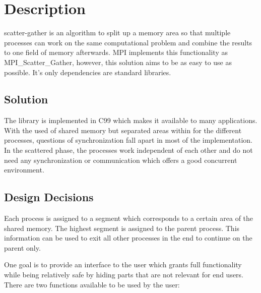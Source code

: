 \documentclass[a4paper]{article}
\begin{document}
\section{Description}

scatter-gather is an algorithm to split up a memory area so that multiple processes can work on the same computational problem and combine the results to one field of memory afterwards. MPI implements this functionality as MPI\_Scatter\_Gather, however, this solution aims to be as easy to use as possible. It's only dependencies are standard libraries.

\subsection{Solution}

The library is implemented in C99 which makes it available to many applications. With the used of shared memory but separated areas within for the different processes, questions of synchronization fall apart in most of the implementation. In the scattered phase, the processes work independent of each other and do not need any synchronization or communication which offers a good concurrent environment. 

\subsection{Design Decisions}

Each process is assigned to a segment which corresponds to a certain area of the shared memory. The highest segment is assigned to the parent process. This information can be used to exit all other processes in the end to continue on the parent only. 

One goal is to provide an interface to the user which grants full functionality while being relatively safe by hiding parts that are not relevant for end users. There are two functions available to be used by the user:
\end{document}
